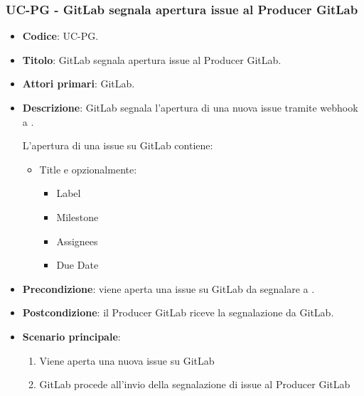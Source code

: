 \subsubsection{UC\theuccount-PG - GitLab segnala apertura issue al Producer GitLab}
	\begin{itemize}
		\item \textbf{Codice}: UC\theuccount-PG.
		\item \textbf{Titolo}: GitLab segnala apertura issue al Producer GitLab.
		\item \textbf{Attori primari}: GitLab.
		\item \textbf{Descrizione}: GitLab segnala l'apertura di una nuova issue tramite webhook a \progetto.
		
		L'apertura di una issue su GitLab contiene:
		\begin{itemize}
			\item Title e opzionalmente:
			\begin{itemize}
				\item Label
				\item Milestone
				\item Assignees
				\item Due Date
			\end{itemize}
		\end{itemize}
		\item \textbf{Precondizione}: viene aperta una issue su GitLab da 
		segnalare a \progetto.
		\item \textbf{Postcondizione}: il Producer GitLab riceve la segnalazione da GitLab.
		\item \textbf{Scenario principale}: 
		\begin{enumerate}
			\item Viene aperta una nuova issue su GitLab
			\item GitLab procede all'invio della segnalazione di issue al Producer GitLab
		\end{enumerate}
		
	\end{itemize}